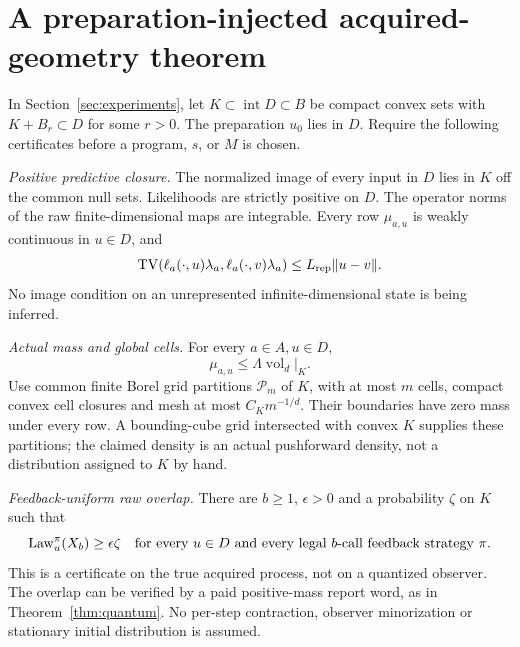 \section{A preparation-injected acquired-geometry theorem}\label{sec:theorem}
\begin{definition}\label{def:class}
In Section~\ref{sec:experiments}, let $K\subset\operatorname{int}D\subset B$ be compact convex sets with $K+B_r\subset D$ for some $r>0$. The preparation $u_0$ lies in $D$. Require the following certificates before a program, $s$, or $M$ is chosen.

\emph{Positive predictive closure.} The normalized image of every input in $D$ lies in $K$ off the common null sets. Likelihoods are strictly positive on $D$. The operator norms of the raw finite-dimensional maps are integrable. Every row $\mu_{a,u}$ is weakly continuous in $u\in D$, and
\begin{equation}\label{eq:report-continuity}
 \operatorname{TV}(\ell_a(\cdot,u)\lambda_a,\ell_a(\cdot,v)\lambda_a)
 \le L_{\rm rep}\lVert u-v\rVert.
\end{equation}
No image condition on an unrepresented infinite-dimensional state is being inferred.

\emph{Actual mass and global cells.} For every $a\in A,u\in D$,
\begin{equation}\label{eq:density}
 \mu_{a,u}\le\Lambda\operatorname{vol}_d|_K.
\end{equation}
Use common finite Borel grid partitions $\mathcal P_m$ of $K$, with at most $m$ cells, compact convex cell closures and mesh at most $C_Km^{-1/d}$. Their boundaries have zero mass under every row. A bounding-cube grid intersected with convex $K$ supplies these partitions; the claimed density is an actual pushforward density, not a distribution assigned to $K$ by hand.

\emph{Feedback-uniform raw overlap.} There are $b\ge1$, $\epsilon>0$ and a probability $\zeta$ on $K$ such that
\begin{equation}\label{eq:overlap}
 \operatorname{Law}_u^\pi(X_b)\ge\epsilon\zeta
 \quad\text{for every }u\in D\text{ and every legal $b$-call feedback strategy }\pi.
\end{equation}
This is a certificate on the true acquired process, not on a quantized observer. The overlap can be verified by a paid positive-mass report word, as in Theorem~\ref{thm:quantum}. No per-step contraction, observer minorization or stationary initial distribution is assumed.
\end{definition}

